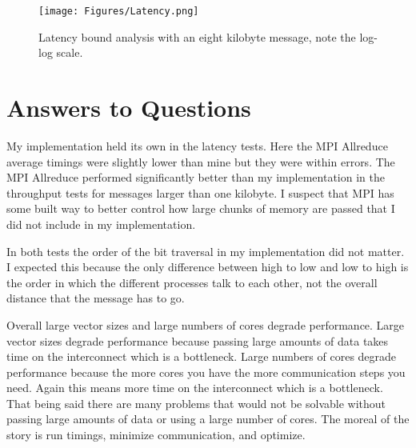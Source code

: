 \documentclass[11pt,a4paper,oneside]{report}
\begin{document}
\begin{figure}[htpb]
  \centering
  \texttt{[image: Figures/Latency.png]}
  \caption{Latency bound analysis with an eight kilobyte message, note the log-log scale.}
  \label{fig:latency}
\end{figure}

\section{Answers to Questions}
My implementation held its own in the latency tests.  Here the MPI Allreduce average timings were slightly lower than mine but they were within errors.   The MPI Allreduce performed significantly better than my implementation in the throughput tests for messages larger than one kilobyte.  I suspect that MPI has some built way to better control how large chunks of memory are passed that I did not include in my implementation.

In both tests the order of the bit traversal in my implementation did not matter.  I expected this because the only difference between high to low and low to high is the order in which the different processes talk to each other, not the overall distance that the message has to go.

Overall large vector sizes and large numbers of cores degrade performance.  Large vector sizes degrade performance because passing large amounts of data takes time on the interconnect which is a bottleneck.  Large numbers of cores degrade performance because the more cores you have the more communication steps you need.  Again this means more time on the interconnect which is a bottleneck.  That being said there are many problems that would not be solvable without passing large amounts of data or using a large number of cores.  The moreal of the story is run timings, minimize communication, and optimize.
\end{document}
